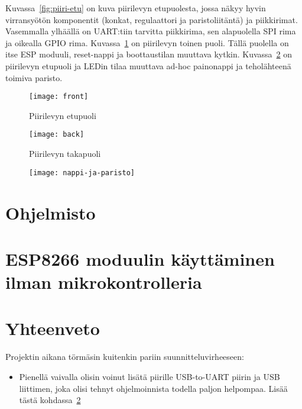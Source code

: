 Kuvassa~\ref{fig:piiri-etu} on kuva piirilevyn etupuolesta, jossa näkyy hyvin
virransyötön komponentit (konkat, regulaattori ja paristoliitäntä) ja
piikkirimat. Vasemmalla ylhäällä on UART:tiin tarvitta piikkirima, sen
alapuolella SPI rima ja oikealla GPIO rima. Kuvassa~\ref{fig:piiri-taka} on
piirilevyn toinen puoli. Tällä puolella on itse ESP moduuli, reset-nappi ja
boottaustilan muuttava kytkin. Kuvassa~\ref{fig:nappi-ja-paristo} on piirilevyn
etupuoli ja LEDin tilaa muuttava ad-hoc painonappi ja teholähteenä toimiva
paristo.
\begin{figure}[H]
\centering
\begin{minipage}{.5\textwidth}
  \centering
  \texttt{[image: front]}
  \caption{Piirilevyn etupuoli}
\label{fig:piiri-etu}
\end{minipage}%
\begin{minipage}{.5\textwidth}
  \centering
  \texttt{[image: back]}
  \caption{Piirilevyn takapuoli}
\label{fig:piiri-taka}
\end{minipage}
\end{figure}
\begin{figure}[H]
  \centering
  \texttt{[image: nappi-ja-paristo]}
  \caption{}
\label{fig:nappi-ja-paristo}
\end{figure}

\section{Ohjelmisto}

\section{ESP8266 moduulin käyttäminen ilman mikrokontrolleria}
\label{sec:extra}

\section{Yhteenveto}

Projektin aikana törmäsin kuitenkin pariin suunnitteluvirheeseen:
\begin{itemize}
  \item Pienellä vaivalla olisin voinut lisätä piirille USB-to-UART piirin ja
    USB liittimen, joka olisi tehnyt ohjelmoinnista todella paljon helpompaa.
    Lisää tästä kohdassa~\ref{sec:extra}
\end{itemize}
